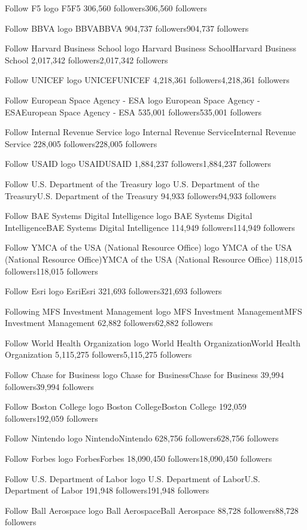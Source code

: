Follow
F5 logo
F5F5
306,560 followers306,560 followers

Follow
BBVA logo
BBVABBVA
904,737 followers904,737 followers

Follow
Harvard Business School logo
Harvard Business SchoolHarvard Business School
2,017,342 followers2,017,342 followers

Follow
UNICEF logo
UNICEFUNICEF
4,218,361 followers4,218,361 followers

Follow
European Space Agency - ESA logo
European Space Agency - ESAEuropean Space Agency - ESA
535,001 followers535,001 followers

Follow
Internal Revenue Service logo
Internal Revenue ServiceInternal Revenue Service
228,005 followers228,005 followers

Follow
USAID logo
USAIDUSAID
1,884,237 followers1,884,237 followers

Follow
U.S. Department of the Treasury logo
U.S. Department of the TreasuryU.S. Department of the Treasury
94,933 followers94,933 followers

Follow
BAE Systems Digital Intelligence logo
BAE Systems Digital IntelligenceBAE Systems Digital Intelligence
114,949 followers114,949 followers

Follow
YMCA of the USA (National Resource Office) logo
YMCA of the USA (National Resource Office)YMCA of the USA (National Resource Office)
118,015 followers118,015 followers

Follow
Esri logo
EsriEsri
321,693 followers321,693 followers

Following
MFS Investment Management logo
MFS Investment ManagementMFS Investment Management
62,882 followers62,882 followers

Follow
World Health Organization logo
World Health OrganizationWorld Health Organization
5,115,275 followers5,115,275 followers

Follow
Chase for Business logo
Chase for BusinessChase for Business
39,994 followers39,994 followers

Follow
Boston College logo
Boston CollegeBoston College
192,059 followers192,059 followers

Follow
Nintendo logo
NintendoNintendo
628,756 followers628,756 followers

Follow
Forbes logo
ForbesForbes
18,090,450 followers18,090,450 followers

Follow
U.S. Department of Labor logo
U.S. Department of LaborU.S. Department of Labor
191,948 followers191,948 followers

Follow
Ball Aerospace logo
Ball AerospaceBall Aerospace
88,728 followers88,728 followers

